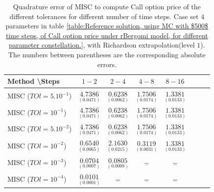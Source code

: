 \documentclass[11pt]{article}
\begin{document}
\begin{table}[h!]
	\centering
	\begin{tabular}{l*{6}{c}r}
		Method \textbackslash  Steps            & $1-2$ & $2-4$ & $4-8$ & $8-16$  \\
		\hline
		MISC ($TOl=5.10^{-1}$)  & $\underset{(0.0471)}{\mathbf{ 4.7386}}$ & $\underset{( 0.0062)}{\mathbf{  0.6238}}$ & $\underset{(  0.0174
			)}{\mathbf{
				1.7506}}$ & $\underset{(  0.0133
			)}{\mathbf{ 
				1.3381
		}}$ \\
		MISC ($TOl=10^{-1}$)  & $\underset{(0.0471)}{\mathbf{ 4.7386}}$ & $\underset{( 0.0062)}{\mathbf{  0.6238}}$ & $\underset{(  0.0174
			)}{\mathbf{
				1.7506}}$ &  $\underset{(  0.0133
			)}{\mathbf{ 
				1.3381
		}}$  \\
		MISC ($TOl=5.10^{-2}$)  & $\underset{(0.0471)}{\mathbf{ 4.7386}}$ & $\underset{( 0.0062)}{\mathbf{  0.6238}}$ & $\underset{(  0.0174
			)}{\mathbf{
				1.7506}}$ &  $\underset{(  0.0133
			)}{\mathbf{ 
				1.3381
		}}$  \\
		MISC ($TOl=10^{-2}$)  & $\underset{( 0.0065) }{\mathbf{    0.6540
		}}$ & $\underset{(0.0215)}{\mathbf{  2.1630}}$ & $\underset{(     0.0031
			
			)}{\mathbf{
				0.3119}}$ &  $\underset{(  0.0133
			)}{\mathbf{ 
				1.3381
		}}$ \\
		MISC ($TOl=10^{-3}$)  & $\underset{(0.0007 ) }{\mathbf{  0.0704  
		}}$ & $\underset{(0.0008)}{\mathbf{0.0805}}$ &$\underset{-}{\mathbf{-}}$ & $\underset{-}{\mathbf{-}}$  \\
		MISC ($TOl=10^{-4}$)  & $\underset{(0.0001 ) }{\mathbf{   0.0101  
		}}$ & $\underset{-}{\mathbf{-}}$ &$\underset{-}{\mathbf{-}}$ & $\underset{-}{\mathbf{-}}$  \\
		\hline
	\end{tabular}
	\caption{Quadrature error of MISC to compute Call option price of the different tolerances for different number of time steps. Case set $4$ parameters in table \ref{table:Reference solution, using MC with $500$ time steps, of Call option price under rBergomi model, for different parameter constellation.}, with Richardson extrapolation(level $1$). The numbers between parentheses are the corresponding absolute errors.}
	\label{Quadrature error of MISC to compute Call option price of the different tolerances for different number of time steps. Case set $4$ parameters, with Richardson extrapolation(level $1$). The numbers between parentheses are the corresponding absolute errors.}
\end{table}
\end{document}
